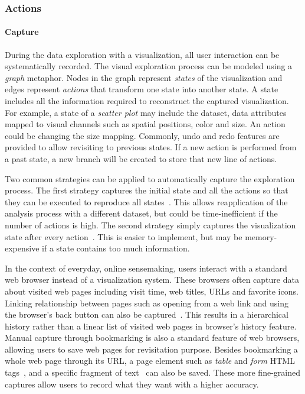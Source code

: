 \subsubsection{Actions}

\paragraph{Capture}
During the data exploration with a visualization, all user interaction can be systematically recorded. The visual exploration process can be modeled using a \textit{graph} metaphor. Nodes in the graph represent \textit{states} of the visualization and edges represent \textit{actions} that transform one state into another state. A state includes all the information required to reconstruct the captured visualization. For example, a state of a \textit{scatter plot} may include the dataset, data attributes mapped to visual channels such as spatial positions, color and size. An action could be changing the size mapping. Commonly, undo and redo features are provided to allow revisiting to previous states. If a new action is performed from a past state, a new branch will be created to store that new line of actions.

Two common strategies can be applied to automatically capture the exploration process. The first strategy captures the initial state and all the actions so that they can be executed to reproduce all states~\cite{Kadivar2009}. This allows reapplication of the analysis process with a different dataset, but could be time-inefficient if the number of actions is high. The second strategy simply captures the visualization state after every action~\cite{Bavoil2005}. This is easier to implement, but may be memory-expensive if a state contains too much information.

In the context of everyday, online sensemaking, users interact with a standard web browser instead of a visualization system. These browsers often capture data about visited web pages including visit time, web titles, URLs and favorite icons. Linking relationship between pages such as opening from a web link and using the browser's back button can also be captured~\cite{Ayers1995,Hightower1998,Milic-Frayling2003}. This results in a hierarchical history rather than a linear list of visited web pages in browser's history feature. Manual capture through bookmarking is also a standard feature of web browsers, allowing users to save web pages for revisitation purpose. Besides bookmarking a whole web page through its URL, a page element such as \textit{table} and \textit{form} HTML tags~\cite{Hong2008}, and a specific fragment of text~\cite{Dontcheva2006} can also be saved. These more fine-grained captures allow users to record what they want with a higher accuracy.

